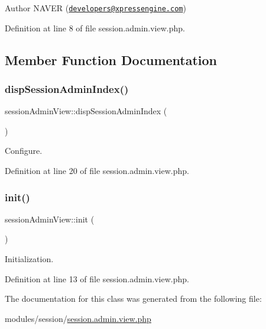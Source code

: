 \begin{DoxyAuthor}{Author}
N\+A\+V\+ER (\href{mailto:developers@xpressengine.com}{\tt developers@xpressengine.\+com}) 
\end{DoxyAuthor}


Definition at line 8 of file session.\+admin.\+view.\+php.



\subsection{Member Function Documentation}
\mbox{\label{classsessionAdminView_af76bbb38a12a68e4ab36fa67c0b1fe06}} 
\subsubsection{\texorpdfstring{disp\+Session\+Admin\+Index()}{dispSessionAdminIndex()}}
{\footnotesize\ttfamily session\+Admin\+View\+::disp\+Session\+Admin\+Index (\begin{DoxyParamCaption}{ }\end{DoxyParamCaption})}



Configure. 



Definition at line 20 of file session.\+admin.\+view.\+php.

\mbox{\label{classsessionAdminView_af890ef145e5fa8e0d092ab204ef104d6}} 
\subsubsection{\texorpdfstring{init()}{init()}}
{\footnotesize\ttfamily session\+Admin\+View\+::init (\begin{DoxyParamCaption}{ }\end{DoxyParamCaption})}



Initialization. 



Definition at line 13 of file session.\+admin.\+view.\+php.



The documentation for this class was generated from the following file\+:\begin{DoxyCompactItemize}
\item 
modules/session/\hyperlink{session_8admin_8view_8php}{session.\+admin.\+view.\+php}\end{DoxyCompactItemize}
